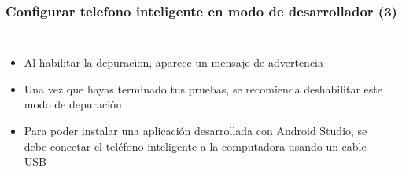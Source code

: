 \begin{frame}
\frametitle{Configurar telefono inteligente en modo de desarrollador (3)}  
\begin{columns}

\begin{itemize}
\item Al habilitar la depuracion, aparece un mensaje de advertencia
\item Una vez que hayas terminado tus pruebas, se recomienda deshabilitar este modo de depuraci\'on
\item Para poder instalar una aplicaci\'on desarrollada con Android Studio, se debe conectar el tel\'efono inteligente a la computadora usando un cable USB
\end{itemize}

\begin{center}

\end{center}
\end{columns}
\end{frame}
